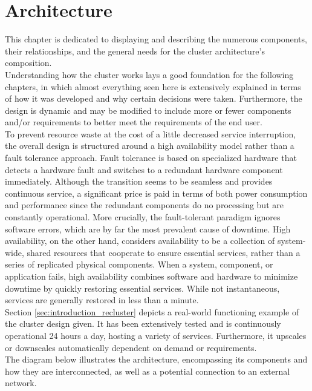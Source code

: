 \chapter{Architecture}
\label{cha:architecture}

This chapter is dedicated to displaying and describing the numerous components,
their relationships, and the general needs for the cluster architecture's composition.
\\ %
Understanding how the cluster works lays a good foundation for the following chapters,
in which almost everything seen here is extensively explained in terms of how it
was developed and why certain decisions were taken. Furthermore, the design is
dynamic and may be modified to include more or fewer components and/or
requirements to better meet the requirements of the end user. \\ %
To prevent resource waste at the cost of a little decreased service interruption,
the overall design is structured around a high availability model rather than a fault
tolerance approach. Fault tolerance is based on specialized hardware that
detects a hardware fault and switches to a redundant hardware component
immediately. Although the transition seems to be seamless and provides continuous
service, a significant price is paid in terms of both power consumption and
performance since the redundant components do no processing but are constantly
operational. More crucially, the fault-tolerant paradigm ignores software errors,
which are by far the most prevalent cause of downtime. High availability, on the
other hand, considers availability to be a collection of system-wide, shared resources
that cooperate to ensure essential services, rather than a series of replicated
physical components. When a system, component, or application fails, high
availability combines software and hardware to minimize downtime by quickly
restoring essential services. While not instantaneous, services are generally
restored in less than a minute\cite{high_availability_vs_fault_tolerance}. \\ %
Section \ref{sec:introduction_recluster} depicts a real-world functioning example
of the cluster design given. It has been extensively tested and is continuously
operational 24 hours a day, hosting a variety of services. Furthermore, it upscales
or downscales automatically dependent on demand or requirements. \\ %
The diagram below illustrates the architecture, encompassing its components and
how they are interconnected, as well as a potential connection to an external network.


